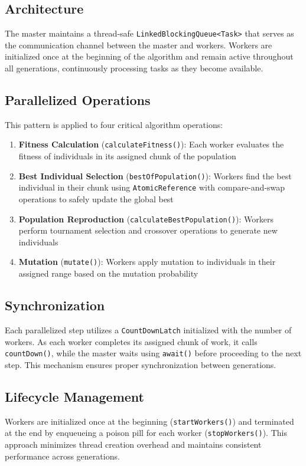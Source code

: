 \subsection{Architecture}
The master maintains a thread-safe \texttt{LinkedBlockingQueue<Task>} that serves as the communication channel between the master and workers. Workers are initialized once at the beginning of the algorithm and remain active throughout all generations, continuously processing tasks as they become available.

\subsection{Parallelized Operations}
This pattern is applied to four critical algorithm operations:

\begin{enumerate}
    \item \textbf{Fitness Calculation} (\texttt{calculateFitness()}): Each worker evaluates the fitness of individuals in its assigned chunk of the population
    \item \textbf{Best Individual Selection} (\texttt{bestOfPopulation()}): Workers find the best individual in their chunk using \texttt{AtomicReference} with compare-and-swap operations to safely update the global best
    \item \textbf{Population Reproduction} (\texttt{calculateBestPopulation()}): Workers perform tournament selection and crossover operations to generate new individuals
    \item \textbf{Mutation} (\texttt{mutate()}): Workers apply mutation to individuals in their assigned range based on the mutation probability
\end{enumerate}

\subsection{Synchronization}
Each parallelized step utilizes a \texttt{CountDownLatch} initialized with the number of workers. As each worker completes its assigned chunk of work, it calls \texttt{countDown()}, while the master waits using \texttt{await()} before proceeding to the next step. This mechanism ensures proper synchronization between generations.

\subsection{Lifecycle Management}
Workers are initialized once at the beginning (\texttt{startWorkers()}) and terminated at the end by enqueueing a poison pill for each worker (\texttt{stopWorkers()}). This approach minimizes thread creation overhead and maintains consistent performance across generations.

